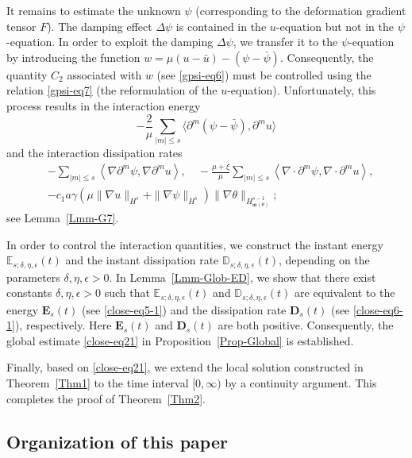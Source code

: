 \documentclass[reqno,11pt]{amsart}
\numberwithin{equation}{section}
\def\w{\mathfrak{w}}
\begin{document}
It remains to estimate the unknown \(\psi\) (corresponding to the deformation gradient tensor \(F\)). The damping effect \(\Delta \psi\) is contained in the \(u\)-equation but not in the \(\psi\)-equation. In order to exploit the damping \(\Delta\psi\), we transfer it to the \(\psi\)-equation by introducing the function \(w = \mu (u -\bar{u}) - (\psi-\bar{\psi})\). Consequently, the quantity \(C_2\) associated with \(w\) (see \eqref{gpsi-eq6}) must be controlled using the relation \eqref{gpsi-eq7} (the reformulation of the \(u\)-equation). Unfortunately, this process results in the interaction energy
\[
-\frac{2}{\mu} \sum_{|m|\leq s} \langle \partial^m (\psi-\bar{\psi}), \partial^m u \rangle
\]
and the interaction dissipation rates
\begin{align*}
  & -\sum_{|m|\leq s} \left\langle \nabla \partial^{m} \psi, \nabla \partial^{m} u \right\rangle,\quad
-\frac{\mu + \xi}{\mu} \sum_{|m|\leq s} \left\langle \nabla \cdot \partial^{m} \psi, \nabla \cdot \partial^{m} u \right\rangle, \\
& -c_{1} a \gamma \left( \mu \| \nabla u \|_{H^{s}}+\| \nabla \psi \|_{H^{s}} \right) \| \nabla \theta \|_{H^{s - 1}_{\w (\theta)}};
\end{align*}
see Lemma~\ref{Lmm-G7}.

In order to control the interaction quantities, we construct the instant energy \( \mathbb{E}_{s; \delta,\eta,\epsilon} (t) \) and the instant dissipation rate \( \mathbb{D}_{s; \delta,\eta,\epsilon} (t) \), depending on the parameters \( \delta, \eta, \epsilon > 0 \). In Lemma~\ref{Lmm-Glob-ED}, we show that there exist constants \( \delta, \eta, \epsilon > 0 \) such that \( \mathbb{E}_{s; \delta,\eta,\epsilon} (t) \) and \( \mathbb{D}_{s; \delta,\eta,\epsilon} (t) \) are equivalent to the energy \( \mathbf{E}_{s}(t) \) (see \eqref{close-eq5-1}) and the dissipation rate \( \mathbf{D}_{s}(t) \) (see \eqref{close-eq6-1}), respectively. Here \( \mathbf{E}_{s}(t) \) and \( \mathbf{D}_{s}(t) \) are both positive. Consequently, the global estimate \eqref{close-eq21} in Proposition~\ref{Prop-Global} is established.

Finally, based on \eqref{close-eq21}, we extend the local solution constructed in Theorem~\ref{Thm1} to the time interval $[0,\infty)$ by a continuity argument. This completes the proof of Theorem~\ref{Thm2}.


\subsection{Organization of this paper}
\end{document}
